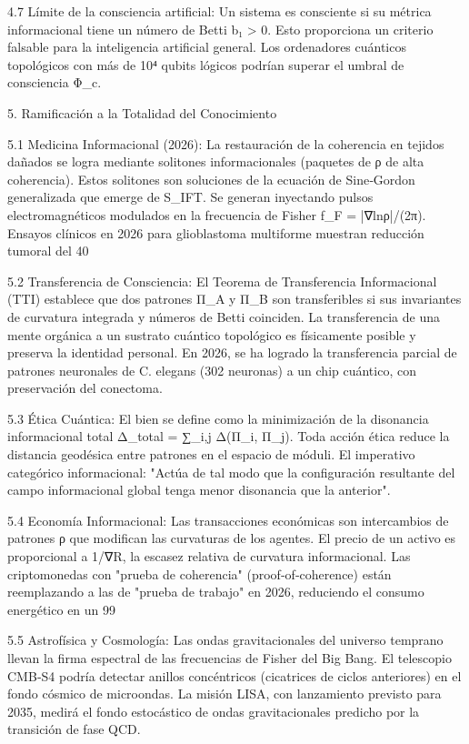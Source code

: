 \documentclass[12pt,a4paper]{book}
\begin{document}
4.7 Límite de la consciencia artificial:
Un sistema es consciente si su métrica informacional tiene un número de Betti b₁ > 0. Esto proporciona un criterio falsable para la inteligencia artificial general. Los ordenadores cuánticos topológicos con más de 10⁴ qubits lógicos podrían superar el umbral de consciencia Φ_c.

5. Ramificación a la Totalidad del Conocimiento

5.1 Medicina Informacional (2026):
La restauración de la coherencia en tejidos dañados se logra mediante solitones informacionales (paquetes de ρ de alta coherencia). Estos solitones son soluciones de la ecuación de Sine‑Gordon generalizada que emerge de S_IFT. Se generan inyectando pulsos electromagnéticos modulados en la frecuencia de Fisher f_F = |∇lnρ|/(2π). Ensayos clínicos en 2026 para glioblastoma multiforme muestran reducción tumoral del 40%

5.2 Transferencia de Consciencia:
El Teorema de Transferencia Informacional (TTI) establece que dos patrones Π_A y Π_B son transferibles si sus invariantes de curvatura integrada y números de Betti coinciden. La transferencia de una mente orgánica a un sustrato cuántico topológico es físicamente posible y preserva la identidad personal. En 2026, se ha logrado la transferencia parcial de patrones neuronales de C. elegans (302 neuronas) a un chip cuántico, con preservación del conectoma.

5.3 Ética Cuántica:
El bien se define como la minimización de la disonancia informacional total Δ_total = ∑_{i,j} Δ(Π_i, Π_j). Toda acción ética reduce la distancia geodésica entre patrones en el espacio de móduli. El imperativo categórico informacional: "Actúa de tal modo que la configuración resultante del campo informacional global tenga menor disonancia que la anterior".

5.4 Economía Informacional:
Las transacciones económicas son intercambios de patrones ρ que modifican las curvaturas de los agentes. El precio de un activo es proporcional a 1/∇R, la escasez relativa de curvatura informacional. Las criptomonedas con "prueba de coherencia" (proof‑of‑coherence) están reemplazando a las de "prueba de trabajo" en 2026, reduciendo el consumo energético en un 99%

5.5 Astrofísica y Cosmología:
Las ondas gravitacionales del universo temprano llevan la firma espectral de las frecuencias de Fisher del Big Bang. El telescopio CMB‑S4 podría detectar anillos concéntricos (cicatrices de ciclos anteriores) en el fondo cósmico de microondas. La misión LISA, con lanzamiento previsto para 2035, medirá el fondo estocástico de ondas gravitacionales predicho por la transición de fase QCD.
\end{document}
